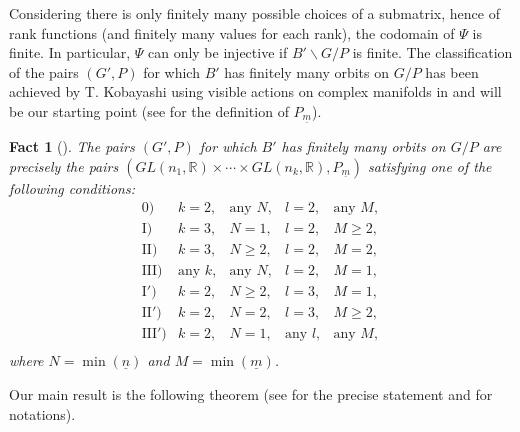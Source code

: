 \documentclass[pdftex]{sigma}
\numberwithin{equation}{section}
\theoremstyle{definition}
\newcommand{\R}{\mathbb{R}}
\theoremstyle{plain}
\theoremstyle{plain}
\newtheorem{fact}{Fact}
\theoremstyle{plain}
\theoremstyle{plain}
\begin{document}
Considering there is only finitely many possible choices of a submatrix, hence of rank functions (and finitely many values for each rank), the codomain of $\Psi$ is finite.
In particular, $\Psi$ can only be injective if $B'\backslash G/P$ is finite.
The classification of the pairs $(G',P)$ for which $B'$ has finitely many orbits on $G/P$ has been achieved by T. Kobayashi using visible actions on complex manifolds in \cite{ActionVisible} and will be our starting point (see  for the definition of $P_{\underline m}$).

\setcounter{fact}{2}
\begin{fact}[\cite{ActionVisible}]\label{Fact Kob}
	The pairs $(G',P)$ for which $B'$ has finitely many orbits on $G/P$ are precisely the pairs $(GL(n_1,\R)\times \cdots \times GL(n_k,\R), P_{\underline m})$ satisfying one of the following conditions:
\begin{equation*}
	\begin{array}{rcccc}
		0) & k = 2, & \text{any } N, & l=2, & \text{any } M,\\
		\mathrm{I}) & k = 3, & N = 1, & l = 2, & M \geqslant 2,\\
		\mathrm{II}) & k = 3, & N \geqslant 2, & l = 2, & M = 2, \\
		\mathrm{III}) & \text{any } k, & \text{any } N, & l = 2, & M = 1, \\
		\mathrm{I}') & k = 2, & N \geqslant 2, & l = 3, & M = 1,\\
		\mathrm{II}') & k = 2, & N = 2, & l = 3, & M \geqslant 2,\\
		\mathrm{III}') & k = 2, & N = 1, & \text{any } l, & \text{any } M, \\
	\end{array}
\end{equation*}
where $N = \min(\underline n)$ and $M = \min(\underline m)$.
\end{fact}

Our main result is the following theorem (see  for the precise statement and  for notations).
\end{document}
